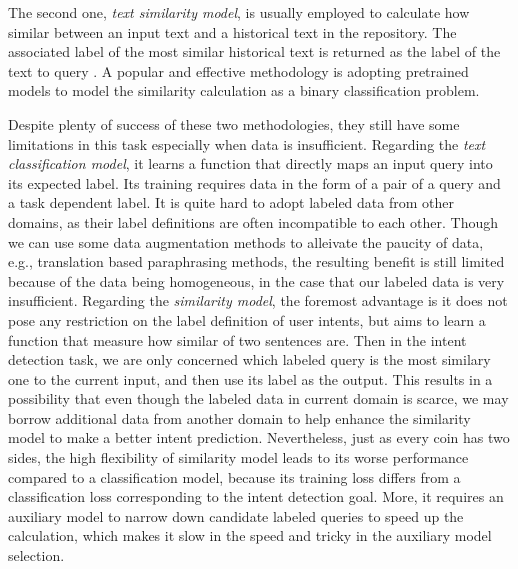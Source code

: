The second one, \emph{text similarity model}, is usually employed to calculate how similar between an input text and a historical text in the repository. 
The associated label of the most similar historical text is returned as the label of the text to query \cite{jafarpour2010filter, leuski2011npceditor}. 
A popular and effective methodology is adopting pretrained models to model the similarity calculation as a binary classification problem.

Despite plenty of success of these two methodologies, they still have some limitations in this task especially when data is insufficient.
Regarding the \emph{text classification model}, it learns a function that directly maps an input query into its expected label.
Its training requires data in the form of a pair of a query and a task dependent label. 
It is quite hard to adopt labeled data from other domains, as their label definitions are often incompatible to each other. 
Though we can use some data augmentation methods to alleivate the paucity of data, e.g., translation based paraphrasing methods, the resulting benefit is still limited because of the data being homogeneous, in the case that our labeled data is very insufficient.
Regarding the \emph{similarity model}, the foremost advantage is it does not pose any restriction on the label definition of user intents, but aims to learn a function that measure how similar of two sentences are. 
Then in the intent detection task, we are only concerned which labeled query is the most similary one to the current input, and then use its label as the output.
This results in a possibility that even though the labeled data in current domain is scarce, we may borrow additional data from another domain to help enhance the similarity model to make a better intent prediction.
Nevertheless, just as every coin has two sides, the high flexibility of similarity model leads to its worse performance compared to a classification model, because its training loss differs from a classification loss corresponding to the intent detection goal.
More, it requires an auxiliary model to narrow down candidate labeled queries to speed up the calculation, which makes it slow in the speed and tricky in the auxiliary model selection. 

